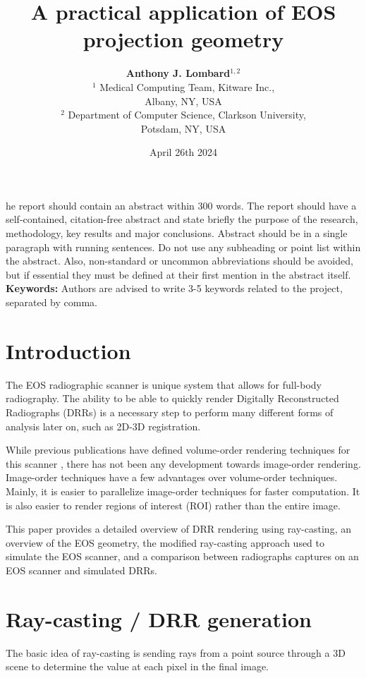 \documentclass[11pt,twocolumn]{article}
\title{\bf \Huge A practical application of EOS\textregistered{} projection geometry}
\author{{\bf \Large Anthony J. Lombard$^{1,2}$}\\
  $^1$ Medical Computing Team, Kitware Inc.,\\
  Albany, NY, USA\\
  $^2$ Department of Computer Science, Clarkson University,\\ 
  Potsdam, NY, USA
  }
\date{April 26th 2024}
\begin{document}
\maketitle

he report should contain an abstract within 300 words. The report should have a self-contained, citation-free abstract and state briefly the purpose of the research, methodology, key results and major conclusions. Abstract should be in a single paragraph with running sentences. Do not use any subheading or point list within the abstract. Also, non-standard or uncommon abbreviations should be avoided, but if essential they must be defined at their first mention in the abstract itself.  
\noindent
{\bf Keywords:} Authors are advised to write 3-5 keywords related to the project, separated by comma. 

\section{Introduction}

The EOS\textregistered{} radiographic scanner is unique system that allows for full-body radiography. 
The ability to be able to quickly render Digitally Reconstructed Radiographs (DRRs) is a necessary step to perform
many different forms of analysis later on, such as 2D-3D registration. 

While previous publications have defined volume-order rendering techniques for this scanner \cite{groisser2019geometry},
there has not been any development towards image-order rendering. Image-order techniques have a few advantages over 
volume-order techniques. Mainly, it is easier to parallelize image-order techniques for faster computation. It is also 
easier to render regions of interest (ROI) rather than the entire image.

This paper provides a detailed overview of DRR rendering using ray-casting, an overview of the EOS\textregistered{} 
geometry, the modified ray-casting approach used to simulate the EOS\textregistered{} scanner, and a comparison 
between radiographs captures on an EOS\textregistered{} scanner and simulated DRRs. 

\section{Ray-casting / DRR generation}
The basic idea of ray-casting is sending rays from a point source through a 3D scene to determine the value at each 
pixel in the final image. 
\end{document}
